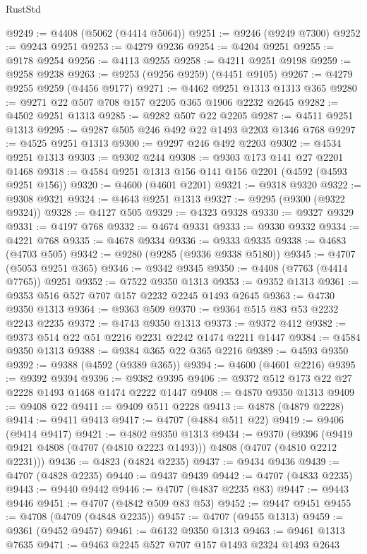 \begin{lexlean}{RustStd}
\begin{coremodule}
@9249 := @4408 (@5062 (@4414 @5064))
@9251 := @9246 (@9249 @7300)
@9252 := @9243 @9251
@9253 := @4279 @9236
@9254 := @4204 @9251
@9255 := @9178 @9254
@9256 := @4113 @9255
@9258 := @4211 @9251 @9198
@9259 := @9258 @9238
@9263 := @9253 (@9256 @9259) (@4451 @9105)
@9267 := @4279 @9255 @9259 (@4456 @9177)
@9271 := @4462 @9251 @1313 @1313 @365
@9280 := @9271 @22 @507 @708 @157 @2205 @365 @1906 @2232 @2645
@9282 := @4502 @9251 @1313
@9285 := @9282 @507 @22 @2205
@9287 := @4511 @9251 @1313
@9295 := @9287 @505 @246 @492 @22 @1493 @2203 @1346 @768
@9297 := @4525 @9251 @1313
@9300 := @9297 @246 @492 @2203
@9302 := @4534 @9251 @1313
@9303 := @9302 @244
@9308 := @9303 @173 @141 @27 @2201 @1468
@9318 := @4584 @9251 @1313 @156 @141 @156 @2201 (@4592 (@4593 @9251 @156))
@9320 := @4600 (@4601 @2201)
@9321 := @9318 @9320
@9322 := @9308 @9321
@9324 := @4643 @9251 @1313
@9327 := @9295 (@9300 (@9322 @9324))
@9328 := @4127 @505
@9329 := @4323 @9328
@9330 := @9327 @9329
@9331 := @4197 @768
@9332 := @4674 @9331
@9333 := @9330 @9332
@9334 := @4221 @768
@9335 := @4678 @9334
@9336 := @9333 @9335
@9338 := @4683 (@4703 @505)
@9342 := @9280 (@9285 (@9336 @9338 @5180))
@9345 := @4707 (@5053 @9251 @365)
@9346 := @9342 @9345
@9350 := @4408 (@7763 (@4414 @7765)) @9251
@9352 := @7522 @9350 @1313
@9353 := @9352 @1313
@9361 := @9353 @516 @527 @707 @157 @2232 @2245 @1493 @2645
@9363 := @4730 @9350 @1313
@9364 := @9363 @509
@9370 := @9364 @515 @83 @53 @2232 @2243 @2235
@9372 := @4743 @9350 @1313
@9373 := @9372 @412
@9382 := @9373 @514 @22 @51 @2216 @2231 @2242 @1474 @2211 @1447
@9384 := @4584 @9350 @1313
@9388 := @9384 @365 @22 @365 @2216
@9389 := @4593 @9350
@9392 := @9388 (@4592 (@9389 @365))
@9394 := @4600 (@4601 @2216)
@9395 := @9392 @9394
@9396 := @9382 @9395
@9406 := @9372 @512 @173 @22 @27 @2228 @1493 @1468 @1474 @2222 @1447
@9408 := @4870 @9350 @1313
@9409 := @9408 @22
@9411 := @9409 @511 @2228
@9413 := @4878 (@4879 @2228)
@9414 := @9411 @9413
@9417 := @4707 (@4884 @511 @22)
@9419 := @9406 (@9414 @9417)
@9421 := @4802 @9350 @1313
@9434 := @9370
    (@9396 (@9419 @9421 @4808 (@4707 (@4810 @2223 @1493))) @4808 (@4707 (@4810 @2212 @2231)))
@9436 := @4823 (@4824 @2235)
@9437 := @9434 @9436
@9439 := @4707 (@4828 @2235)
@9440 := @9437 @9439
@9442 := @4707 (@4833 @2235)
@9443 := @9440 @9442
@9446 := @4707 (@4837 @2235 @83)
@9447 := @9443 @9446
@9451 := @4707 (@4842 @509 @83 @53)
@9452 := @9447 @9451
@9455 := @4708 (@4709 (@4848 @2235))
@9457 := @4707 (@9455 @1313)
@9459 := @9361 (@9452 @9457)
@9461 := @6132 @9350 @1313
@9463 := @9461 @1313 @7635
@9471 := @9463 @2245 @527 @707 @157 @1493 @2324 @1493 @2643

\end{coremodule}
\end{lexlean}
